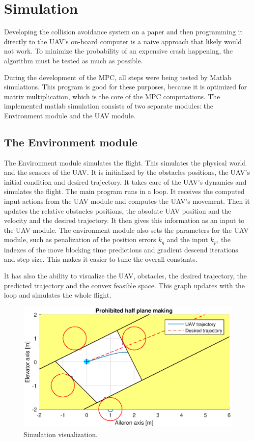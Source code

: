 \documentclass[a4paper,11pt,titlepage]{article}
\begin{document}
\section{Simulation}
Developing the collision avoidance system on a paper and then programming it directly to the UAV's on-board computer is a naive approach that likely would not work. To minimize the probability of an expensive crash happening, the algorithm must be tested as much as possible. 

During the development of the MPC, all steps were being tested by Matlab simulations. This program is good for these purposes, because it is optimized for matrix multiplication, which is the core of the MPC computations. The implemented matlab simulation consists of two separate modules: the Environment module and the UAV module. 

\subsection{The Environment module}

The Environment module simulates the flight. This simulates the physical world and the sensors of the UAV. It is initialized by the obstacles positions, the UAV's initial condition and desired trajectory. It takes care of the UAV's dynamics and simulates the flight. The main program runs in a loop. It receives the computed input actions from the UAV module and computes the UAV's movement. Then it updates the relative obstacles positions, the absolute UAV position and the velocity and the desired trajectory. It then gives this information as an input to the UAV module. The environment module also sets the parameters for the UAV module, such as penalization of the position errors $k_q$ and the input $k_p$, the indexes of the move blocking time predictions and gradient descend iterations and step size. This makes it easier to tune the overall constants.

It has also the ability to visualize the UAV, obstacles, the desired trajectory, the predicted trajectory and the convex feasible space. This graph updates with the loop and simulates the whole flight. 

\begin{figure}[h]
\centering
\includegraphics[width=1\linewidth]{fig/simulace}
\caption{Simulation visualization.}
\label{fig:phantom}
\end{figure}
\end{document}
